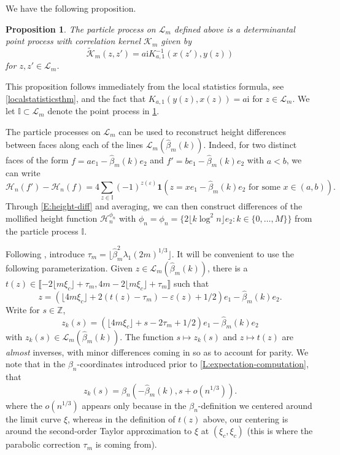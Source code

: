 \documentclass[11pt,twoside]{amsart}
\theoremstyle{plain}
\newtheorem{prop}[thm]{Proposition}
\numberwithin{quest}{section}
\theoremstyle{remark}
\numberwithin{rem}{section}
\theoremstyle{definition}
\newcommand{\eps}{\varepsilon}
\newcommand{\cH}{\mathcal{H}}
\newcommand{\II}[1]{\llbracket #1 \rrbracket}
\begin{document}
We have the following proposition. 
\begin{prop}\label{prop:determinantalpp}
	The particle process on $\mathcal{L}_{m}$ defined above is a determinantal point process with correlation kernel $\mathcal{K}_m$ given by 
	\begin{equation}
		\tilde{\mathcal{K}}_m (z,z') = a\mathrm{i} K_{a,1}^{-1} ( x(z'),y(z))
	\end{equation}
	for $z,z' \in \mathcal{L}_m$. 
\end{prop}
This proposition follows immediately from the local statistics formula, see \cref{localstatisticsthm},  and the fact that $K_{a,1}(y(z),x(z))=a\mathrm{i}$ for $z\in \mathcal{L}_{m}$. We let $\mathbb{I} \subset \mathcal L_m$ denote the point process in \cref{prop:determinantalpp}.

The particle processes on $\mathcal L_m$ can be used to reconstruct height differences between faces along each of the lines $\mathcal L_m(\hat{\beta}_m(k))$. Indeed, for two distinct faces of the form $f = a e_1 - \hat{\beta}_m(k) e_2$ and $f' = b e_1 - \hat{\beta}_m(k) e_2$ with $a < b$, we can write
\begin{equation}
\label{E:height-diff}
\cH_n(f') - \cH_n(f) = 4\sum_{z \in \mathbb{I}} (-1)^{z(\eps)} \mathbf{1}(z = x e_1 - \hat{\beta}_m(k) e_2 \text{ for some } x \in (a, b)).
\end{equation}
Through \eqref{E:height-diff} and averaging, we can then construct differences of the mollified height function $\cH_n^{\phi_n}$ with $\phi_n = \phi_n = \{2\lfloor k \log^2 n \rfloor e_2 : k \in \{0, \dots, M\}\}$ from the particle process $\mathbb{I}$.

Following \cite{BCJ18}, introduce $\tau_m= \lfloor \hat{\beta}^2_m \lambda_1(2m)^{1/3} \rfloor$.  It will be convenient to use the following parameterization. Given $z \in \mathcal{L}_m(\hat{\beta}_m(k))$, there is a $t(z) \in \II{-2\lfloor m\xi_c \rfloor +\tau_m, 4m-2 \lfloor m\xi_c \rfloor +\tau_m}$ such that 
$$
z=(\lfloor 4m\xi_c\rfloor +2(t(z)-\tau_m)-\eps(z)+1/2)e_1-\hat{\beta}_m(k)e_2.
$$
Write for $s \in \mathbb{Z}$,
$$
z_{k}(s)=(\lfloor 4m\xi_c \rfloor +s-2\tau_m+1/2)e_1-\hat{\beta}_m(k)e_2
$$
with $z_{k}(s)\in  \mathcal{L}_m(\hat{\beta}_m(k))$. The function $s \mapsto z_k(s)$ and $z \mapsto t(z)$ are \textit{almost} inverses, with minor differences coming in so as to account for parity. We note that in the $\beta_n$-coordinates introduced prior to \cref{L:expectation-computation}, that
\begin{equation}
\label{E:scaling-translation}
z_k(s) = \beta_n(-\hat{\beta}_m(k), s + o(n^{1/3})).
\end{equation}
where the $o(n^{1/3})$ appears only because in the $\beta_n$-definition we centered around the limit curve $\xi$, whereas in the definition of $t(z)$ above, our centering is around the second-order Taylor approximation to $\xi$ at $(\xi_c, \xi_c)$ (this is where the parabolic correction $\tau_m$ is coming from). 
\end{document}
